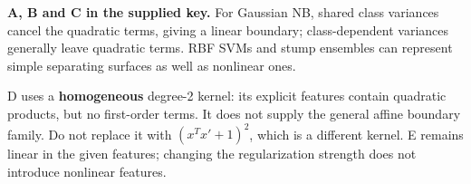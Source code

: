 \textbf{A, B and C in the supplied key.} For Gaussian NB, shared class variances cancel the quadratic terms, giving a linear boundary; class-dependent variances generally leave quadratic terms. RBF SVMs and stump ensembles can represent simple separating surfaces as well as nonlinear ones.


D uses a \textbf{homogeneous} degree-2 kernel: its explicit features contain quadratic products, but no first-order terms. It does not supply the general affine boundary family. Do not replace it with \((x^Tx'+1)^2\), which is a different kernel. E remains linear in the given features; changing the regularization strength does not introduce nonlinear features.
